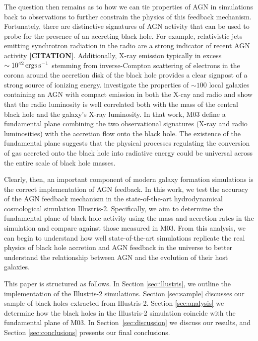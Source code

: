 The question then remains as to how we can tie properties of AGN in
simulations back to observations to further constrain the physics
of this feedback mechanism. Fortunately, there are distinctive signatures
of AGN activity that can be used to probe for the presence of an accreting
black hole. For example, relativistic jets emitting synchrotron radiation
in the radio are a strong indicator of recent AGN activity \textbf{{[}CITATION{]}}.
Additionally, X-ray emission typically in excess $\sim10^{42}\,{\rm ergs}\,{\rm s^{-1}}$
stemming from inverse-Compton scattering of electrons in the corona
around the accretion disk of the black hole provides a clear signpost
of a strong source of ionizing energy. \citet[hereafter, M03]{merloni2003afundamental}
investigate the properties of $\sim100$ local galaxies containing
an AGN with compact emission in both the X-ray and radio and show
that the radio luminosity is well correlated both with the mass of
the central black hole and the galaxy's X-ray luminosity. In that
work, M03 define a fundamental plane combining the two observational
signatures (X-ray and radio luminosities) with the accretion flow
onto the black hole. The existence of the fundamental plane suggests
that the physical processes regulating the conversion of gas accreted
onto the black hole into radiative energy could be universal across
the entire scale of black hole masses.

Clearly, then, an important component of modern galaxy formation simulations
is the correct implementation of AGN feedback. In this work, we test
the accuracy of the AGN feedback mechanism in the state-of-the-art
hydrodynamical cosmological simulation Illustris-2. Specifically,
we aim to determine the fundamental plane of black hole activity using
the mass and accretion rates in the simulation and compare against
those measured in M03. From this analysis, we can begin to understand
how well state-of-the-art simulations replicate the real physics of
black hole accretion and AGN feedback in the universe to better understand
the relationship between AGN and the evolution of their host galaxies.

This paper is structured as follows. In Section \ref{sec:illustris},
we outline the implementation of the Illustris-2 simulations. Section
\ref{sec:sample} discusses our sample of black holes extracted from
Illustris-2. Section \ref{sec:analysis} we determine how the black
holes in the Illustris-2 simulation coincide with the fundamental
plane of M03. In Section~\ref{sec:discussion} we discuss our results,
and Section \ref{sec:conclusions} presents our final conclusions.
